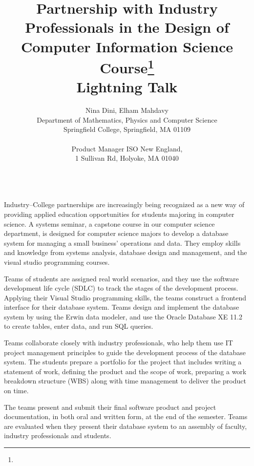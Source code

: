 \documentclass{article}
\title{Partnership with Industry Professionals in the Design of Computer Information Science Course\footnote{\protect}\\
\vspace{0.2in}
\large Lightning Talk\\}
\author{
Nina Dini\affmark[1], Elham Mahdavy\affmark[2]\\
\affmark[1]Department of Mathematics, Physics and Computer Science\\
Springfield College, Springfield, MA 01109\\
\email{ndini@springfield.edu}\\
\affmark[2]Product Manager ISO New England,\\
1 Sullivan Rd, Holyoke, MA 01040\\
\email{emahdavy95@gmail.com}\\
}
\begin{document}
\maketitle

Industry–College partnerships are increasingly being recognized as a new way of providing applied education opportunities for students majoring in computer science. A systems seminar, a capstone course in our computer science department, is designed for computer science majors to develop a database system for managing a small business' operations and data. They employ skills and knowledge from systems analysis, database design and management, and the visual studio programming courses.

Teams of students are assigned real world scenarios, and they use the software development life cycle (SDLC) to track the stages of the development process. Applying their Visual Studio programming skills, the teams construct a frontend interface for their database system. Teams design and implement the database system by using the Erwin data modeler, and use the Oracle Database XE 11.2 to create tables, enter data, and run SQL queries.

Teams collaborate closely with industry professionals, who help them use IT project management principles to guide the development process of the database system. The students prepare a portfolio for the project that includes writing a statement of work, defining the product and the scope of work, preparing a work breakdown structure (WBS) along with time management to deliver the product on time.


The teams present and submit their final software product and project documentation, in both oral and written form, at the end of the semester. Teams are evaluated when they present their database system to an assembly of faculty, industry professionals and students.
\end{document}
